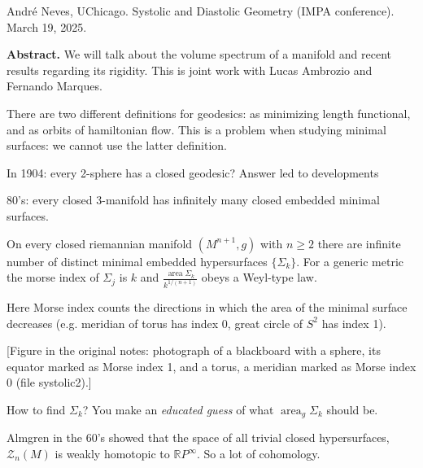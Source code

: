 \noindent
André Neves, UChicago. Systolic and
Diastolic Geometry (IMPA conference).
March 19, 2025.

\medskip\noindent
{\bf Abstract.}
We will talk about the volume spectrum of a
manifold and recent results regarding its
rigidity. This is joint work with Lucas
Ambrozio and Fernando Marques.

\medskip
There are two different definitions for
geodesics: as minimizing length functional,
and as orbits of hamiltonian flow. This is a
problem when studying minimal surfaces: we
cannot use the latter definition.

\begin{remark}
\label{remark-neves-poincare-question}
In 1904: every 2-sphere has a closed
geodesic? Answer led to developments
\end{remark}

\begin{remark}
\label{remark-neves-yau-conjecture}
80's: every closed 3-manifold has infinitely
many closed embedded minimal surfaces.
\end{remark}

\begin{theorem}
\label{theorem-neves-infinitely-many-minimal}
On every closed riemannian manifold
$(M^{n+1},g)$ with $n \geq 2$ there are
infinite number of distinct minimal embedded
hypersurfaces $\{\Sigma_k\}$. For a generic
metric the morse index of $\Sigma_j$ is $k$
and $\frac{ \operatorname{area}
\Sigma_k}{k^{1/(n+1)}}$ obeys a Weyl-type
law.
\end{theorem}

\begin{remark}
\label{remark-neves-morse-index}
Here Morse index counts the directions in
which the area of the minimal surface
decreases (e.g. meridian of torus has index
0, great circle of $S^2$ has index 1).

[Figure in the original notes: photograph of
a blackboard with a sphere, its equator
marked as Morse index 1, and a torus, a
meridian marked as Morse index 0 (file
systolic2).]
\end{remark}

How to find $\Sigma_k$? You make an
\textit{educated guess} of what
$\operatorname{area}_g\Sigma_k$ should be.

Almgren in the 60's showed that the space of
all trivial closed hypersurfaces,
$\mathcal{Z}_n(M)$ is weakly homotopic to
$\mathbb{R}P^{\infty}$. So a lot of
cohomology.

